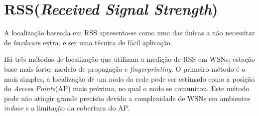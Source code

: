 \section{RSS(\textit{Received Signal Strength})}	
	A localização baseada em RSS apresenta-se como uma das únicas a não necessitar de \textit{hardware} extra, e ser uma técnica
de fácil aplicação. 
	
	Há três métodos de localização que utilizam a medição de RSS em WSNs: estação base mais forte, modelo de propagação e \textit{fingerprinting}.
	O primeiro método é o mais simples, a localização de um nodo da rede pode ser estimado como a posição do \textit{Access Points}(AP) mais próximo, no 
	qual o nodo se comunicou. Este método pode não atingir grande precisão devido a complexidade de WSNs em ambientes \textit{indoor} e 
	a limitação da cobertura do AP.
	
